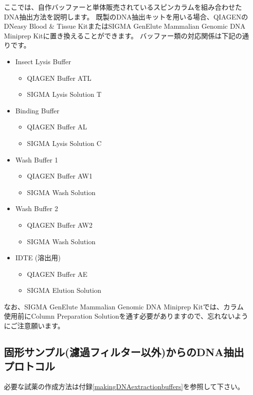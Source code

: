 \documentclass[titlepage,10pt,a4paper,uplatex]{jsbook}
\begin{document}
ここでは、自作バッファーと単体販売されているスピンカラムを組み合わせたDNA抽出方法を説明します。
既製のDNA抽出キットを用いる場合、QIAGENのDNeasy Blood \& Tissue KitまたはSIGMA GenElute Mammalian Genomic DNA Miniprep Kitに置き換えることができます。
バッファー類の対応関係は下記の通りです。

\begin{itemize}
\item Insect Lysis Buffer
\begin{itemize}
\item QIAGEN Buffer ATL
\item SIGMA Lysis Solution T
\end{itemize}
\item Binding Buffer
\begin{itemize}
\item QIAGEN Buffer AL
\item SIGMA Lysis Solution C
\end{itemize}
\item Wash Buffer 1
\begin{itemize}
\item QIAGEN Buffer AW1
\item SIGMA Wash Solution
\end{itemize}
\item Wash Buffer 2
\begin{itemize}
\item QIAGEN Buffer AW2
\item SIGMA Wash Solution
\end{itemize}
\item IDTE (溶出用)
\begin{itemize}
\item QIAGEN Buffer AE
\item SIGMA Elution Solution
\end{itemize}
\end{itemize}

なお、SIGMA GenElute Mammalian Genomic DNA Miniprep Kitでは、カラム使用前にColumn Preparation Solutionを通す必要がありますので、忘れないようにご注意願います。

\subsection{固形サンプル(濾過フィルター以外)からのDNA抽出プロトコル}

必要な試薬の作成方法は付録\ref{makingDNAextractionbuffers}を参照して下さい。
\end{document}
